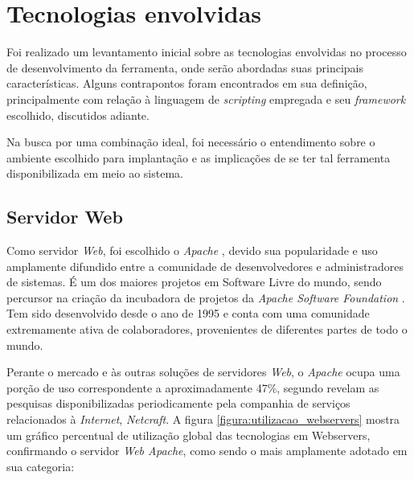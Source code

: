 \section{Tecnologias envolvidas}

Foi realizado um levantamento inicial sobre as tecnologias envolvidas no processo de desenvolvimento da ferramenta, onde serão abordadas suas principais características. Alguns contrapontos foram encontrados em sua definição, principalmente com relação à linguagem de \textit{scripting} empregada e seu \textit{framework} escolhido, discutidos adiante.

Na busca por uma combinação ideal, foi necessário o entendimento sobre o ambiente escolhido para implantação e as implicações de se ter tal ferramenta disponibilizada em meio ao sistema.

\subsection{Servidor Web}

Como servidor \textit{Web}, foi escolhido o \textit{Apache} \cite{ApacheHttpd}, devido sua popularidade e uso amplamente difundido entre a comunidade de desenvolvedores e administradores de sistemas. É um dos maiores projetos em Software Livre do mundo, sendo percursor na criação da incubadora de projetos da \textit{Apache Software Foundation} \cite{ApacheSWFoundation}. Tem sido desenvolvido desde o ano de 1995 e conta com uma comunidade extremamente ativa de colaboradores, provenientes de diferentes partes de todo o mundo.

Perante o mercado e às outras soluções de servidores \textit{Web}, o \textit{Apache} ocupa uma porção de uso correspondente a aproximadamente 47\%, segundo revelam as pesquisas \cite{Netcraft} disponibilizadas periodicamente pela companhia de serviços relacionados à \textit{Internet}, \textit{Netcraft}. A figura \ref{figura:utilizacao_webservers} mostra um gráfico percentual de utilização global das tecnologias em Webservers, confirmando o servidor \textit{Web Apache}, como sendo o mais amplamente adotado em sua categoria:


